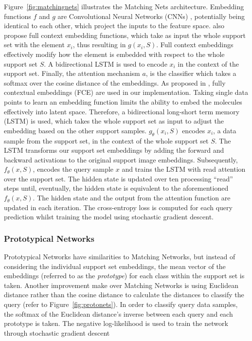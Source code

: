 Figure~\ref{fig:matchingnets} illustrates the Matching Nets architecture. Embedding functions $f$ and $g$ are Convolutional Neural Networks (CNNs) \citep{lecun1995convolutional}, potentially being identical to each other, which project the inputs to the feature space. \citet{vinyals2016matching} also propose full context embedding functions, which take as input the whole support set with the element $x_i$, thus resulting in \( g(x_i, S) \). Full context embeddings effectively modify how the element is embedded with respect to the whole support set $S$. A bidirectional LSTM is used to encode $x_i$ in the context of the support set. Finally, the attention mechanism $a$, is the classifier which takes a softmax over the cosine distance of the embeddings. As proposed in \citet{vinyals2016matching}, fully contextual embeddings (FCE) are used in our implementation. Taking single data points to learn an embedding function limits the ability to embed the molecules effectively into latent space. Therefore, a bidirectional long-short term memory (LSTM) is used, which takes the whole support set as input to adjust the embedding based on the other support samples. $g_\theta(x_i, S)$ encodes $x_i$, a data sample from the support set, in the context of the whole support set $S$. The LSTM transforms our support set embeddings by adding the forward and backward activations to the original support image embeddings. Subsequently, $f_\theta(x, S)$, encodes the query sample $x$ and trains the LSTM with read attention over the support set. The hidden state is updated over ten processing ``read'' steps until, eventually, the hidden state is equivalent to the aforementioned $f_\theta(x, S)$. The hidden state and the output from the attention function are updated in each iteration. The cross-entropy loss is computed for each query prediction whilst training the model using stochastic gradient descent.

\subsubsection{Prototypical Networks}

Prototypical Networks \citep{snell2017prototypical} have similarities to Matching Networks, but instead of considering the individual support set embeddings, the mean vector of the embeddings (referred to as the \textit{prototype}) for each class within the support set is taken. Another improvement \citet{snell2017prototypical} make over Matching Networks is using Euclidean distance rather than the cosine distance to calculate the distances to classify the query (refer to Figure~\ref{fig:protonets}). In order to classify query data samples, the softmax of the Euclidean distance's inverse between each query and each prototype is taken. The negative log-likelihood is used to train the network through stochastic gradient descent

